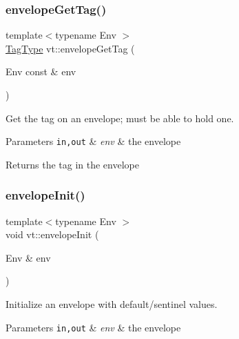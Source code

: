 \subsubsection{\texorpdfstring{envelope\+Get\+Tag()}{envelopeGetTag()}}
{\footnotesize\ttfamily template$<$typename Env $>$ \\
\hyperlink{namespacevt_a84ab281dae04a52a4b243d6bf62d0e52}{Tag\+Type} vt\+::envelope\+Get\+Tag (\begin{DoxyParamCaption}\item[{Env const \&}]{env }\end{DoxyParamCaption})\hspace{0.3cm}{\ttfamily [inline]}}



Get the tag on an envelope; must be able to hold one. 


\begin{DoxyParams}[1]{Parameters}
\mbox{\tt in,out}  & {\em env} & the envelope\\
\hline
\end{DoxyParams}
\begin{DoxyReturn}{Returns}
the tag in the envelope 
\end{DoxyReturn}
\mbox{\label{namespacevt_a26b669aa49c2c9fa4a0fb88902518adb}} 
\subsubsection{\texorpdfstring{envelope\+Init()}{envelopeInit()}}
{\footnotesize\ttfamily template$<$typename Env $>$ \\
void vt\+::envelope\+Init (\begin{DoxyParamCaption}\item[{Env \&}]{env }\end{DoxyParamCaption})\hspace{0.3cm}{\ttfamily [inline]}}



Initialize an envelope with default/sentinel values. 


\begin{DoxyParams}[1]{Parameters}
\mbox{\tt in,out}  & {\em env} & the envelope \\
\hline
\end{DoxyParams}
\mbox{\label{namespacevt_a931b61a10a85d44d2355e984e40177ff}} 
